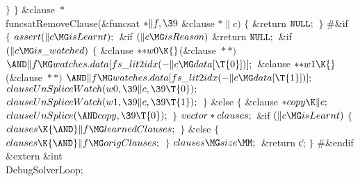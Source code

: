 {{{{{\4${}\}{}$\2\6
\4${}\}{}$\2\7
\&{clause} ${}{*}{}$\\{funcsatRemoveClause}(\&{funcsat} ${}{*}\|f,\39{}$%
\&{clause} ${}{*}\|c){}$\1\1\2\2\6
${}\{{}$\1\6
\&{return} ${}{\tt NULL};{}$\6
\4${}\}{}$\2\6
\8\#\&{if} \7
${}\{{}$\1\6
${}\\{assert}(\|c\MG\\{isLearnt});{}$\6
\&{if} ${}(\|c\MG\\{isReason}){}$\1\5
\&{return} ${}{\tt NULL};{}$\2\6
\&{if} ${}(\|c\MG\\{is\_watched}){}$\5
${}\{{}$\1\6
\&{clause} ${}{*}{*}\\{w0}\K{}$(\&{clause} ${}{*}{*}){}$ ${}{\AND}\|f\MG%
\\{watches}.\\{data}[\\{fs\_lit2idx}({-}\|c\MG\\{data}[\T{0}])];{}$\6
\&{clause} ${}{*}{*}\\{w1}\K{}$(\&{clause} ${}{*}{*}){}$ ${}{\AND}\|f\MG%
\\{watches}.\\{data}[\\{fs\_lit2idx}({-}\|c\MG\\{data}[\T{1}])];{}$\7
${}\\{clauseUnSpliceWatch}(\\{w0},\39\|c,\39\T{0});{}$\6
${}\\{clauseUnSpliceWatch}(\\{w1},\39\|c,\39\T{1});{}$\6
\4${}\}{}$\2\6
\&{else}\5
${}\{{}$\1\6
\&{clause} ${}{*}\\{copy}\K\|c;{}$\7
${}\\{clauseUnSplice}({\AND}\\{copy},\39\T{0});{}$\6
\4${}\}{}$\2\6
${}\\{vector}*\\{clauses};{}$\6
\&{if} ${}(\|c\MG\\{isLearnt}){}$\5
${}\{{}$\1\6
${}\\{clauses}\K{\AND}\|f\MG\\{learnedClauses};{}$\6
\4${}\}{}$\2\6
\&{else}\5
${}\{{}$\1\6
${}\\{clauses}\K{\AND}\|f\MG\\{origClauses};{}$\6
\4${}\}{}$\2\6
${}\\{clauses}\MG\\{size}\MM;{}$\6
\&{return} \|c;\6
\4${}\}{}$\2\6
\8\#\&{endif}\7
\&{extern} \&{int} \\{DebugSolverLoop};\7
}}}}}
